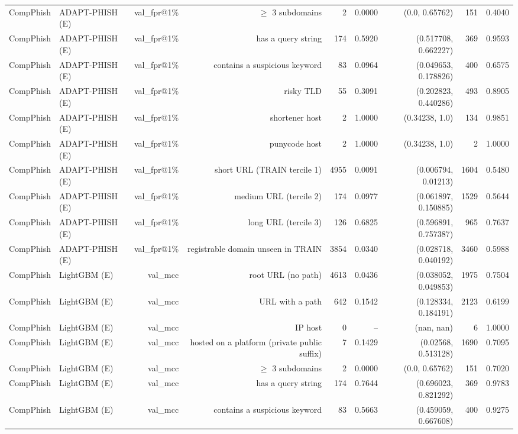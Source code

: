 \begin{table}[t]
\begin{tabular}{llrrrrrrr}
CompPhish & ADAPT-PHISH (E) & val\_fpr@1\% & $\geq$ 3 subdomains & 2 & 0.0000 & (0.0, 0.65762) & 151 & 0.4040 \\
CompPhish & ADAPT-PHISH (E) & val\_fpr@1\% & has a query string & 174 & 0.5920 & (0.517708, 0.662227) & 369 & 0.9593 \\
CompPhish & ADAPT-PHISH (E) & val\_fpr@1\% & contains a suspicious keyword & 83 & 0.0964 & (0.049653, 0.178826) & 400 & 0.6575 \\
CompPhish & ADAPT-PHISH (E) & val\_fpr@1\% & risky TLD & 55 & 0.3091 & (0.202823, 0.440286) & 493 & 0.8905 \\
CompPhish & ADAPT-PHISH (E) & val\_fpr@1\% & shortener host & 2 & 1.0000 & (0.34238, 1.0) & 134 & 0.9851 \\
CompPhish & ADAPT-PHISH (E) & val\_fpr@1\% & punycode host & 2 & 1.0000 & (0.34238, 1.0) & 2 & 1.0000 \\
CompPhish & ADAPT-PHISH (E) & val\_fpr@1\% & short URL (TRAIN tercile 1) & 4955 & 0.0091 & (0.006794, 0.01213) & 1604 & 0.5480 \\
CompPhish & ADAPT-PHISH (E) & val\_fpr@1\% & medium URL (tercile 2) & 174 & 0.0977 & (0.061897, 0.150885) & 1529 & 0.5644 \\
CompPhish & ADAPT-PHISH (E) & val\_fpr@1\% & long URL (tercile 3) & 126 & 0.6825 & (0.596891, 0.757387) & 965 & 0.7637 \\
CompPhish & ADAPT-PHISH (E) & val\_fpr@1\% & registrable domain unseen in TRAIN & 3854 & 0.0340 & (0.028718, 0.040192) & 3460 & 0.5988 \\
CompPhish & LightGBM (E) & val\_mcc & root URL (no path) & 4613 & 0.0436 & (0.038052, 0.049853) & 1975 & 0.7504 \\
CompPhish & LightGBM (E) & val\_mcc & URL with a path & 642 & 0.1542 & (0.128334, 0.184191) & 2123 & 0.6199 \\
CompPhish & LightGBM (E) & val\_mcc & IP host & 0 & -- & (nan, nan) & 6 & 1.0000 \\
CompPhish & LightGBM (E) & val\_mcc & hosted on a platform (private public suffix) & 7 & 0.1429 & (0.02568, 0.513128) & 1690 & 0.7095 \\
CompPhish & LightGBM (E) & val\_mcc & $\geq$ 3 subdomains & 2 & 0.0000 & (0.0, 0.65762) & 151 & 0.7020 \\
CompPhish & LightGBM (E) & val\_mcc & has a query string & 174 & 0.7644 & (0.696023, 0.821292) & 369 & 0.9783 \\
CompPhish & LightGBM (E) & val\_mcc & contains a suspicious keyword & 83 & 0.5663 & (0.459059, 0.667608) & 400 & 0.9275 \\

\end{tabular}
\end{table}
